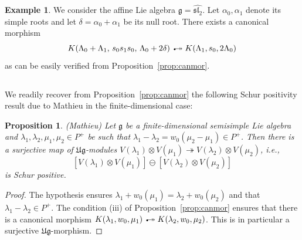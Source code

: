 \documentclass[12pt,reqno]{amsart}
\theoremstyle{plain}
\newtheorem{proposition}[theorem]{Proposition}
\theoremstyle{definition}
\newtheorem{example}[theorem]{Example}
\theoremstyle{remark}
\theoremstyle{plain}
\newcommand{\lie}{\mathfrak}
\newcommand{\twoheadrightarrowtail}{%
  \mathrel{\mathrlap{\scalebox{0.75}{\textbullet}}\twoheadrightarrow}}
\newcommand{\canmor}{\twoheadrightarrowtail}
\begin{document}
\begin{example}
We consider the affine Lie algebra $\mathfrak{g}=\widehat{\lie{sl}_2}$. Let $\alpha_0, \alpha_1$ denote its simple roots and let $\delta=\alpha_0 + \alpha_1$ be its null root. There exists a canonical morphism 
\[ K(\Lambda_0 + \Lambda_1, \,s_0 s_1 s_0, \,\Lambda_0 + 2\delta) \canmor 
K(\Lambda_1, s_0, 2\Lambda_0) \]
as can be easily verified from Proposition~\ref{prop:canmor}.
\end{example}

\subsection{}
We readily recover from Proposition~\ref{prop:canmor} the following Schur positivity result due to Mathieu \cite[Lemma 2.1]{M2} in the finite-dimensional case:
\begin{proposition}\label{lem:mathieu} (Mathieu)
Let $\lie g$ be a finite-dimensional semisimple Lie algebra and $\lambda_1, \lambda_2, \mu_1, \mu_2 \in P^+$ be such that $\lambda_1 - \lambda_2 = w_0(\mu_2 - \mu_1) \in P^+$. Then there is a surjective map of $\lie{Ug}$-modules $V(\lambda_1) \otimes V(\mu_1) \twoheadrightarrow V(\lambda_2) \otimes V(\mu_2)$, i.e., \[[V(\lambda_1) \otimes V(\mu_1)] \ominus [V(\lambda_2) \otimes V(\mu_2)]\] is Schur positive.
\end{proposition}
\begin{proof}
The hypothesis ensures $\lambda_1 + w_0(\mu_1) = \lambda_2 + w_0(\mu_2)$ and that $\lambda_1 - \lambda_2 \in P^+$. The condition (iii) of Proposition~\ref{prop:canmor} ensures that there is a canonical morphism $K(\lambda_1,w_0,\mu_1) \canmor K(\lambda_2,w_0,\mu_2)$. This is in particular a surjective $\lie{Ug}$-morphism.
\end{proof}
\end{document}
